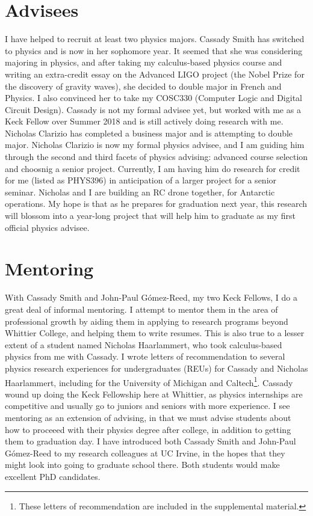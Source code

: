 \documentclass[../main.tex]{subfiles}
\begin{document}
\section{Advisees}

I have helped to recruit at least two physics majors.  Cassady Smith has switched to physics and is now in her sophomore year.  It seemed that she was considering majoring in physics, and after taking my calculus-based physics course and writing an extra-credit essay on the Advanced LIGO project (the Nobel Prize for the discovery of gravity waves), she decided to double major in French and Physics.  I also convinced her to take my COSC330 (Computer Logic and Digital Circuit Design).  Cassady is not my formal advisee yet, but worked with me as a Keck Fellow over Summer 2018 and is still actively doing research with me.  Nicholas Clarizio has completed a business major and is attempting to double major.  Nicholas Clarizio is now my formal physics advisee, and I am guiding him through the second and third facets of physics advising: advanced course selection and choosnig a senior project.  Currently, I am having him do research for credit for me (listed as PHYS396) in anticipation of a larger project for a senior seminar.  Nicholas and I are building an RC drone together, for Antarctic operations.  My hope is that as he prepares for graduation next year, this research will blossom into a year-long project that will help him to graduate as my first official physics advisee. \\ \hspace{0.1cm}

\section{Mentoring}

With Cassady Smith and John-Paul G\'{o}mez-Reed, my two Keck Fellows, I do a great deal of informal mentoring.  I attempt to mentor them in the area of professional growth by aiding them in applying to research programs beyond Whittier College, and helping them to write resumes.  This is also true to a lesser extent of a student named Nicholas Haarlammert, who took calculus-based physics from me with Cassady.  I wrote letters of recommendation to several physics research experiences for undergraduates (REUs) for Cassady and Nicholas Haarlammert, including for the University of Michigan and Caltech\footnote{These letters of recommendation are included in the supplemental material.}.  Cassady wound up doing the Keck Fellowship here at Whittier, as physics internships are competitive and usually go to juniors and seniors with more experience.  I see mentoring as an extension of advising, in that we must advise students about how to proceeed with their physics degree after college, in addition to getting them to graduation day.  I have introduced both Cassady Smith and John-Paul G\'{o}mez-Reed to my research colleagues at UC Irvine, in the hopes that they might look into going to graduate school there.  Both students would make excellent PhD candidates. \\ \hspace{0.1cm}
\end{document}

